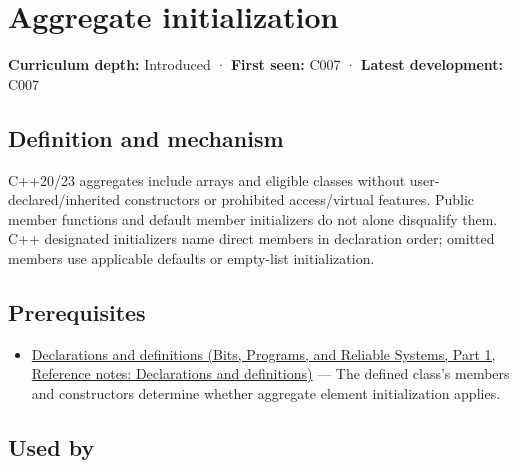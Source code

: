 \hypertarget{appendix-b7174c179542}{}\label{referencestart:appendix-b7174c179542}
\section{Aggregate initialization}\label{appendix-b7174c179542-aggregate-initialization}

\hypertarget{appendix-b7174c179542-aggregate-initialization}{}

\textbf{Curriculum depth:} Introduced · \textbf{First seen:} C007 · \textbf{Latest development:} C007

\begin{allmightroledefinition}

\subsection{Definition and mechanism}\label{appendix-b7174c179542-definition-and-mechanism}

\hypertarget{appendix-b7174c179542-definition-and-mechanism}{}

C++20/23 aggregates include arrays and eligible classes without user-declared/inherited constructors or prohibited access/virtual features. Public member functions and default member initializers do not alone disqualify them. C++ designated initializers name direct members in declaration order; omitted members use applicable defaults or empty-list initialization.

\end{allmightroledefinition}

\subsection{Prerequisites}\label{appendix-b7174c179542-prerequisites}

\hypertarget{appendix-b7174c179542-prerequisites}{}

\begin{itemize}
\tightlist
\item
  \href{../01-Bits-Programs-and-Reliable-Systems-P01/main.pdf\#appendix-2e4d494c2d94}{Declarations and definitions (Bits, Programs, and Reliable Systems, Part 1, Reference notes: Declarations and definitions)} --- The defined class's members and constructors determine whether aggregate element initialization applies.
\end{itemize}

\subsection{Used by}\label{appendix-b7174c179542-used-by}

